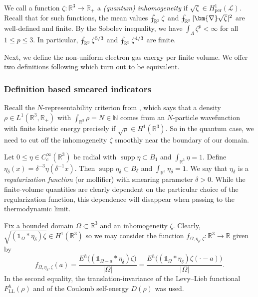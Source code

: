 \documentclass[final,onefignum,onetabnum,reqno]{amsart}
\theoremstyle{remark}
\renewcommand{\le}{\leqslant}
\DeclareMathOperator{\supp}{supp}
\newcommand{\RR}{\mathbb{R}}
\newcommand{\NN}{\mathbb{N}}
\newcommand{\per}{\mathrm{per}} %
\newcommand{\LL}{\mathrm{LL}} %
\newcommand{\iden}{\mathbb{1}} %
\newcommand{\grad}{\bm{\nabla}} %
\def\Xint#1{\mathchoice
{\XXint\displaystyle\textstyle{#1}}%
{\XXint\textstyle\scriptstyle{#1}}%
{\XXint\scriptstyle\scriptscriptstyle{#1}}%
{\XXint\scriptscriptstyle\scriptscriptstyle{#1}}%
\!\int}
\def\XXint#1#2#3{{\setbox0=\hbox{$#1{#2#3}{\int}$ }
\vcenter{\hbox{$#2#3$ }}\kern-.6\wd0}}
\def\dashint{\Xint-}
\newcommand{\LC}{\mathcal{L}}
\begin{document}
We call a function $\zeta:\RR^3\to\RR_+$ a \emph{(quantum) inhomogeneity} if $\sqrt{\zeta}\in H_\per^1(\LC)$. 
Recall that for such functions, the mean values $\dashint_{\RR^3} \zeta$ and $\dashint_{\RR^3} |\grad\sqrt{\zeta}|^2$ are well-defined and finite. 
By the Sobolev inequality, we have $\int_\Lambda \zeta^p<\infty$
for all $1\le p\le 3$. In particular, $\dashint_{\RR^3} \zeta^{5/3}$ and $\dashint_{\RR^3} \zeta^{4/3}$ are finite.

Next, we define the non-uniform electron gas energy per finite volume. We offer two definitions following \cite{lewin2018statistical,lewin2020local} which turn out to be equivalent.

\subsubsection{Definition based smeared indicators}
Recall the $N$-representability criterion from \cite{lieb1983density}, which says that a 
density $\rho\in L^1(\RR^3,\RR_+)$ with $\int_{\RR^3}\rho=N\in\NN$ comes from an $N$-particle wavefunction with finite kinetic energy precisely if $\sqrt{\rho}\in H^1(\RR^3)$. So in the quantum case, we need to cut off the inhomogeneity $\zeta$ smoothly near the boundary of our domain.

Let $0\le \eta\in C_c^\infty(\RR^3)$ be radial with $\supp\eta\subset B_1$ and $\int_{\RR^3}\eta=1$. Define
$\eta_\delta(x)=\delta^{-3} \eta(\delta^{-1}x)$.
Then $\supp\eta_\delta\subset B_{\delta}$ and $\int_{\RR^3} \eta_\delta=1$. We say that $\eta_\delta$ is a \emph{regularization function} (or mollifier) with smearing parameter $\delta>0$. While the finite-volume quantities are clearly dependent on the particular choice of the regularization function, this dependence will disappear when passing to the thermodynamic limit. 

Fix a bounded domain $\Omega\subset\RR^3$ and an inhomogeneity $\zeta$.
Clearly, $\sqrt{(\iden_{\Omega}*\eta_\delta) \zeta}\in H^1(\RR^3)$ so we may consider the function $f_{\Omega,\eta_\delta,\zeta}: \RR^3\to \RR$ given by
\begin{equation}\label{fdef}
f_{\Omega,\eta_\delta,\zeta}(a)= \frac{E^\hbar\bigl((\iden_{\Omega-a}*\eta_\delta)\zeta\bigr)}{|\Omega|}=\frac{E^\hbar\bigl((\iden_{\Omega}*\eta_\delta)\zeta(\cdot-a)\bigr)}{|\Omega|}.
\end{equation}
In the second equality, the translation-invariance of the Levy--Lieb functional $F_\LL^\hbar(\rho)$ and of the Coulomb self-energy $D(\rho)$ was used.
\end{document}
